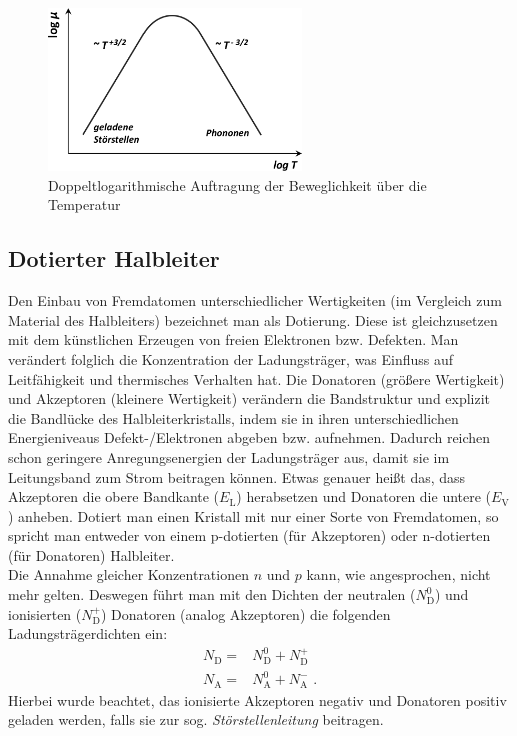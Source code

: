\documentclass[numbers=noenddot,14pt,a4paper]{scrartcl}
\newcommand{\ix}[1]{_\text{#1}}
\newcommand{\tilt}[1]{\textit{#1}}
\begin{document}
\begin{figure}[H]
	\centering
	\includegraphics[width=0.6\textwidth]{beweglichkeit.png}
	\caption{Doppeltlogarithmische Auftragung der Beweglichkeit über die Temperatur}
	\label{img:beweglichkeit}
\end{figure}
\subsection{Dotierter Halbleiter}
Den Einbau von Fremdatomen unterschiedlicher Wertigkeiten (im Vergleich zum Material des Halbleiters) bezeichnet man als Dotierung. Diese ist gleichzusetzen mit dem künstlichen Erzeugen von freien Elektronen bzw. Defekten. Man verändert folglich die Konzentration der Ladungsträger, was Einfluss auf Leitfähigkeit und thermisches Verhalten hat. Die Donatoren (größere Wertigkeit) und Akzeptoren (kleinere Wertigkeit) verändern die Bandstruktur und explizit die Bandlücke des Halbleiterkristalls, indem sie in ihren unterschiedlichen Energieniveaus Defekt-/Elektronen abgeben bzw. aufnehmen. Dadurch reichen schon geringere Anregungsenergien der Ladungsträger aus, damit sie im Leitungsband zum Strom beitragen können. Etwas genauer heißt das, dass Akzeptoren die obere Bandkante ($E\ix{L}$) herabsetzen und Donatoren die untere ($E\ix{V}$) anheben. Dotiert man einen Kristall mit nur einer Sorte von Fremdatomen, so spricht man entweder von einem p-dotierten (für Akzeptoren) oder n-dotierten (für Donatoren) Halbleiter.\\
Die Annahme gleicher Konzentrationen $n$ und $p$ kann, wie angesprochen, nicht mehr gelten. Deswegen führt man mit den Dichten der neutralen ($N\ix{D}^{0}$)  und ionisierten ($N\ix{D}^{+}$) Donatoren (analog Akzeptoren) die folgenden Ladungsträgerdichten ein:
\begin{align}
	N\ix{D}=&N\ix{D}^0+N\ix{D}^+ \label{eq:donator}\\
	N\ix{A}=&N\ix{A}^0+N\ix{A}^- \,\,.
\end{align}
Hierbei wurde beachtet, das ionisierte Akzeptoren negativ und Donatoren positiv geladen werden, falls sie zur sog. \tilt{Störstellenleitung} beitragen.\\
\end{document}
